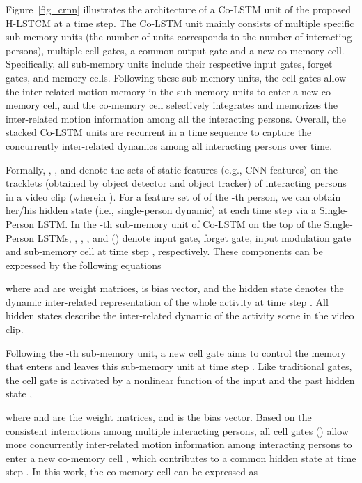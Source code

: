 \documentclass[9pt,journal,letterpaper,twocolumn]{IEEEtran}
\begin{document}
	
	Figure~\ref{fig_crnn} illustrates the architecture of a Co-LSTM unit of the proposed H-LSTCM at a time step. The Co-LSTM unit mainly consists of multiple specific sub-memory units (the number of units corresponds to the number of interacting persons), multiple cell gates, a common output gate and a new co-memory cell. Specifically, all sub-memory units include their respective input gates, forget gates, and memory cells. Following these sub-memory units, the cell gates allow the inter-related motion memory in the sub-memory units to enter a new co-memory cell, and the co-memory cell selectively integrates and memorizes the inter-related motion information among all the interacting persons. Overall, the stacked Co-LSTM units are recurrent in a time sequence to capture the concurrently inter-related dynamics among all interacting persons over time.
	
	
	
	Formally,  , ,  and   denote the sets of static features (e.g., CNN features) on the tracklets (obtained by object detector and object tracker) of  interacting persons in a video clip  (wherein ). For a feature set of   of the -th person, we can obtain her/his hidden state (i.e., single-person dynamic)  at each time step via a Single-Person LSTM. In the -th sub-memory unit of Co-LSTM on the top of the Single-Person LSTMs, , , , and   () denote input gate, forget gate, input modulation gate and sub-memory cell at time step , respectively. These components can be expressed by the following equations
	
	
	
	
	where  and  are weight matrices,  is bias vector, and the hidden state   denotes the dynamic inter-related representation of the whole activity at time step . All hidden states  describe the inter-related dynamic of the activity scene in the video clip.
	
	Following the -th sub-memory unit, a new cell gate  aims to control the memory that enters and leaves this sub-memory unit at time step . Like traditional gates, the cell gate   is activated by a nonlinear function of the input  and the past hidden state ,
	
	where  and  are the weight matrices, and  is the bias vector.
	Based on the consistent interactions  among multiple interacting persons, all cell gates  () allow more concurrently inter-related motion information among interacting persons to enter a new co-memory cell , which contributes to a common hidden state  at time step . In this work, the co-memory cell  can be expressed as 
	
\end{document}

